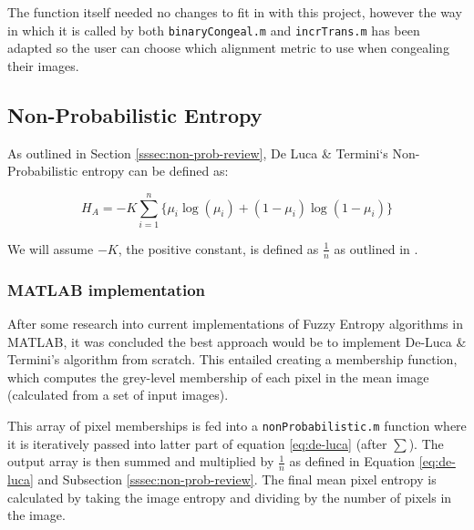 The function itself needed no changes to fit in with this project, however the way in which it is called by both \texttt{binaryCongeal.m} and \texttt{incrTrans.m} has been adapted so the user can choose which alignment metric to use when congealing their images.

\newpage
\subsection{Non-Probabilistic Entropy}
\label{ssec:non-prob-sec}

As outlined in Section \ref{sssec:non-prob-review}, De Luca \& Termini`s Non-Probabilistic entropy can be defined as:

\begin{equation}
  \label{eq:de-luca}
  H_A = -K \displaystyle\sum_{i=1}^{n}{\{\mu_i\log(\mu_i) + (1 - \mu_i)\log(1 - \mu_i)\}}
\end{equation}


We will assume $-K$, the positive constant, is defined as $\frac{1}{n}$ as outlined in \cite{DeLuca_Termini_1972}.

\subsubsection{MATLAB implementation}

After some research into current implementations of Fuzzy Entropy algorithms in MATLAB, it was concluded the best approach would be to implement De-Luca \& Termini's algorithm from scratch. This entailed creating a membership function, which computes the grey-level membership of each pixel in the mean image (calculated from a set of input images).

This array of pixel memberships is fed into a \texttt{nonProbabilistic.m} function where it is iteratively passed into latter part of equation \ref{eq:de-luca} \big(after $\displaystyle\sum$\big). The output array is then summed and multiplied by $\frac{1}{n}$ as defined in Equation \ref{eq:de-luca} and Subsection \ref{sssec:non-prob-review}. The final mean pixel entropy is calculated by taking the image entropy and dividing by the number of pixels in the image.


